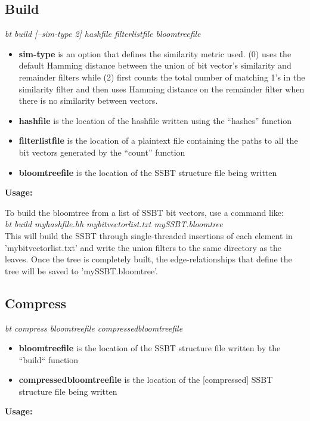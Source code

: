 \documentclass{article}
\begin{document}
\subsection{Build}
\textit{bt build [--sim-type 2] hashfile filterlistfile bloomtreefile}
\begin{itemize}
\item \textbf{sim-type} is an option that defines the similarity metric used. (0) uses the default Hamming distance between the union of bit vector's similarity and remainder filters while (2) first counts the total number of matching 1's in the similarity filter and then uses Hamming distance on the remainder filter when there is no similarity between vectors.
\item \textbf{hashfile} is the location of the hashfile written using the ``hashes'' function
\item \textbf{filterlistfile} is the location of a plaintext file containing the paths to all the bit vectors generated by the ``count'' function
\item \textbf{bloomtreefile} is the location of the SSBT structure file being written
\end{itemize}
\textbf{Usage:}

To build the bloomtree from a list of SSBT bit vectors, use a command like: \\

\textit{bt build myhashfile.hh mybitvectorlist.txt mySSBT.bloomtree} \\

This will build the SSBT through single-threaded insertions of each element in 'mybitvectorlist.txt' and write the union filters to the same directory as the leaves. Once the tree is completely built, the edge-relationships that define the tree will be saved to 'mySSBT.bloomtree'.

\subsection{Compress}
\textit{bt compress bloomtreefile compressedbloomtreefile}
\begin{itemize}
\item \textbf{bloomtreefile} is the location of the SSBT structure file written by the ``build`` function
\item \textbf{compressedbloomtreefile} is the location of the [compressed] SSBT structure file being written
\end{itemize}
\textbf{Usage:}
\end{document}
